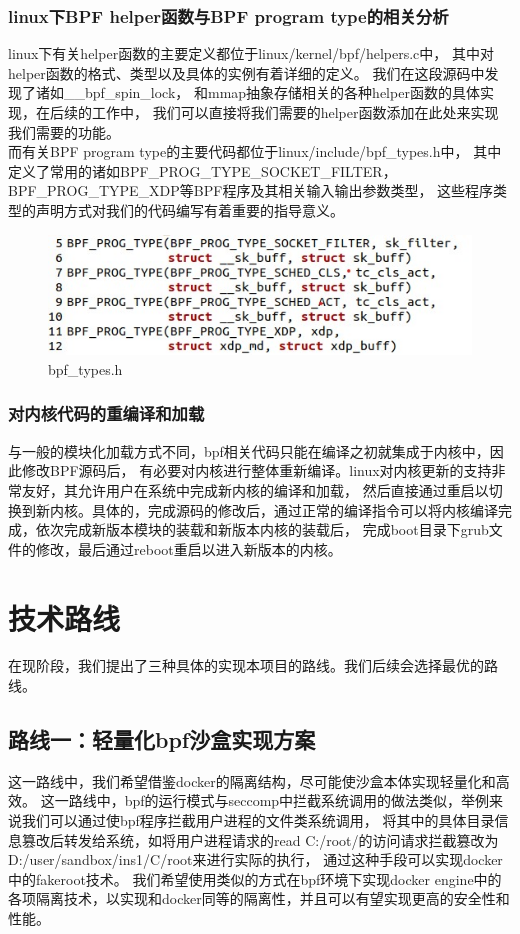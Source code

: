 \documentclass[AutoFakeBold,a4paper]{ctexart}
\begin{document}
\subsubsection{linux下BPF helper函数与BPF program type的相关分析}
linux下有关{\ttfamily helper}函数的主要定义都位于{\ttfamily linux/kernel/bpf/helpers.c}中，
其中对{\ttfamily helper}函数的格式、类型以及具体的实例有着详细的定义。
我们在这段源码中发现了诸如{\ttfamily \_\_bpf\_spin\_lock}，
和{\ttfamily mmap}抽象存储相关的各种{\ttfamily helper}函数的具体实现，在后续的工作中，
我们可以直接将我们需要的{\ttfamily helper}函数添加在此处来实现我们需要的功能。\\ 
而有关BPF program type的主要代码都位于{\ttfamily linux/include/bpf\_types.h}中，
其中定义了常用的诸如{\ttfamily BPF\_PROG\_TYPE\_SOCKET\_FILTER}，
{\ttfamily BPF\_PROG\_TYPE\_XDP}等BPF程序及其相关输入输出参数类型，
这些程序类型的声明方式对我们的代码编写有着重要的指导意义。
\begin{figure}[H]
    \centering
    \includegraphics[width=0.9\columnwidth]{../LvHongtao/pic_3.jpg}
    \caption{\ttfamily bpf\_types.h}
\end{figure}

\subsubsection{对内核代码的重编译和加载}
与一般的模块化加载方式不同，bpf相关代码只能在编译之初就集成于内核中，因此修改BPF源码后，
有必要对内核进行整体重新编译。linux对内核更新的支持非常友好，其允许用户在系统中完成新内核的编译和加载，
然后直接通过重启以切换到新内核。具体的，完成源码的修改后，通过正常的编译指令可以将内核编译完成，依次完成新版本模块的装载和新版本内核的装载后，
完成boot目录下grub文件的修改，最后通过reboot重启以进入新版本的内核。




\section{技术路线}
在现阶段，我们提出了三种具体的实现本项目的路线。我们后续会选择最优的路线。
\subsection{路线一：轻量化bpf沙盒实现方案}\label{路线一}
这一路线中，我们希望借鉴docker的隔离结构，尽可能使沙盒本体实现轻量化和高效。
这一路线中，bpf的运行模式与seccomp中拦截系统调用的做法类似，举例来说我们可以通过使bpf程序拦截用户进程的文件类系统调用，
将其中的具体目录信息篡改后转发给系统，如将用户进程请求的read C:/root/的访问请求拦截篡改为D:/user/sandbox/ins1/C/root来进行实际的执行，
通过这种手段可以实现docker中的fakeroot技术。
我们希望使用类似的方式在bpf环境下实现docker engine中的各项隔离技术，以实现和docker同等的隔离性，并且可以有望实现更高的安全性和性能。
\end{document}
